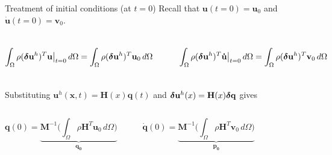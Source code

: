 \documentclass[aspectratio=169]{beamer}
\begin{document}
\begin{frame}{Treatment of initial conditions (at $t=0$)}
  Recall that $\mathbf u(t=0)=\mathbf u_0$ and $\dot{\mathbf u}(t=0)=\mathbf v_0$.
  \begin{columns}[c]
    \[
      \int_{\Omega}\rho(\boldsymbol\delta\mathbf u^{h})^{T}\mathbf u\big |_{t=0}\, d\Omega =\int_{\Omega}\rho (\boldsymbol\delta\mathbf u^{h})^{T}\mathbf u_0\, d\Omega
    \]

    \centering
    \rule{0.5pt}{1.5cm}

    \[
      \int_{\Omega}\rho(\boldsymbol\delta\mathbf u^{h})^{T}\mathbf{\dot u}\big |_{t=0}\, d\Omega =\int_{\Omega}\rho (\boldsymbol\delta\mathbf u^{h})^{T}\mathbf v_0\, d\Omega
    \]
  \end{columns}
  \vspace{0.4cm}
  Substituting $\mathbf u^{h}(\mathbf x,t)=\mathbf H(x)\mathbf q(t)$ and $\boldsymbol\delta\mathbf u^{h}(x)=\mathbf H(x)\boldsymbol\delta\mathbf q$ gives
  \vspace{0.4cm}
  \begin{columns}[c]
    \[
      \mathbf q(0)=\underbrace{\mathbf M^{-1}\Big(\int_{\Omega} \rho \mathbf H^{T}\mathbf u_{0}\, d\Omega\Big)}_\text{$\mathbf{q_{0}}$}
    \]

    \centering
    \rule{0.5pt}{3cm}

    \[
      \mathbf{\dot q}(0)=\underbrace{\mathbf M^{-1}\Big(\int_{\Omega} \rho \mathbf H^{T}\mathbf v_{0}\, d\Omega\Big)}_\text{$\mathbf{p_{0}}$}
    \]
  \end{columns}
\end{frame}
\end{document}
